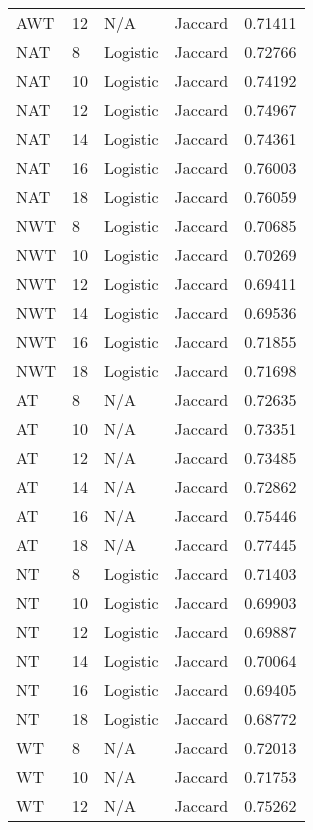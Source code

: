 \documentclass{article}
\begin{document}
\begin{center}
\begin{supertabular}{| l | l | l | l | l |}
               AWT & 12 & N/A & Jaccard & 0.71411 \\
               NAT & 8 & Logistic & Jaccard & 0.72766 \\
               NAT & 10 & Logistic & Jaccard & 0.74192 \\
               NAT & 12 & Logistic & Jaccard & 0.74967 \\
               NAT & 14 & Logistic & Jaccard & 0.74361 \\
               NAT & 16 & Logistic & Jaccard & 0.76003 \\
               NAT & 18 & Logistic & Jaccard & 0.76059 \\
               NWT & 8 & Logistic & Jaccard & 0.70685 \\
               NWT & 10 & Logistic & Jaccard & 0.70269 \\
               NWT & 12 & Logistic & Jaccard & 0.69411 \\
               NWT & 14 & Logistic & Jaccard & 0.69536 \\
               NWT & 16 & Logistic & Jaccard & 0.71855 \\
               NWT & 18 & Logistic & Jaccard & 0.71698 \\
               AT & 8 & N/A & Jaccard & 0.72635 \\
               AT & 10 & N/A & Jaccard & 0.73351 \\
               AT & 12 & N/A & Jaccard & 0.73485 \\
               AT & 14 & N/A & Jaccard & 0.72862 \\
               AT & 16 & N/A & Jaccard & 0.75446 \\
               AT & 18 & N/A & Jaccard & 0.77445 \\
               NT & 8 & Logistic & Jaccard & 0.71403 \\
               NT & 10 & Logistic & Jaccard & 0.69903 \\
               NT & 12 & Logistic & Jaccard & 0.69887 \\
               NT & 14 & Logistic & Jaccard & 0.70064 \\
               NT & 16 & Logistic & Jaccard & 0.69405 \\
               NT & 18 & Logistic & Jaccard & 0.68772 \\
               WT & 8 & N/A & Jaccard & 0.72013 \\
               WT & 10 & N/A & Jaccard & 0.71753 \\
               WT & 12 & N/A & Jaccard & 0.75262 \\

\end{supertabular}
\end{center}
\end{document}
